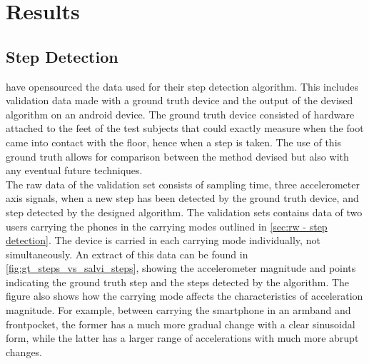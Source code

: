 \chapter{Results}

\section{Step Detection}
\citet{Salvi2018} have opensourced the data used for their step detection algorithm. This includes validation data made with a ground truth device and the output of the devised algorithm on an android device. The ground truth device consisted of hardware attached to the feet of the test subjects that could exactly measure when the foot came into contact with the floor, hence when a step is taken. The use of this ground truth allows for comparison between the method devised but also with any eventual future techniques.\\
The raw data of the validation set consists of sampling time, three accelerometer axis signals, when a new step has been detected by the ground truth device, and step detected by the designed algorithm. The validation sets contains data of two users carrying the phones in the carrying modes outlined in \cref{sec:rw - step detection}. The device is carried in each carrying mode individually, not simultaneously. An extract of this data can be found in \cref{fig:gt_steps_vs_salvi_steps}, showing the accelerometer magnitude and points indicating the ground truth step and the steps detected by the \citet{Salvi2018} algorithm. The figure also shows how the carrying mode affects the characteristics of acceleration magnitude. For example, between carrying the smartphone in an armband and frontpocket, the former has a much more gradual change with a clear sinusoidal form, while the latter has a larger range of accelerations with much more abrupt changes.  

